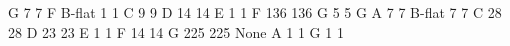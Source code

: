 \documentclass[letterpaper,10pt,english]{sphinxmanual}
\begin{document}
{\begin{sphinxVerbatim}[commandchars=\\\{\}]
                   G                          7                   7
F                  B-flat                     1                   1
                   C                          9                   9
                   D                         14                  14
                   E                          1                   1
                   F                        136                 136
                   G                          5                   5
G                  A                          7                   7
                   B-flat                     7                   7
                   C                         28                  28
                   D                         23                  23
                   E                          1                   1
                   F                         14                  14
                   G                        225                 225
None               A                          1                   1
                   G                          1                   1


\end{sphinxVerbatim}}
\end{document}
